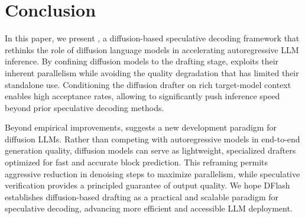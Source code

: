 \section{Conclusion}
\label{sec:conclusion}

In this paper, we present \method, a diffusion-based speculative decoding framework that rethinks the role of diffusion language models in accelerating autoregressive LLM inference. By confining diffusion models to the drafting stage, \method exploits their inherent parallelism while avoiding the quality degradation that has limited their standalone use. Conditioning the diffusion drafter on rich target-model context enables high acceptance rates, allowing \method to significantly push inference speed beyond prior speculative decoding methods.

Beyond empirical improvements, \method suggests a new development paradigm for diffusion LLMs. Rather than competing with autoregressive models in end-to-end generation quality, diffusion models can serve as lightweight, specialized drafters optimized for fast and accurate block prediction. This reframing permits aggressive reduction in denoising steps to maximize parallelism, while speculative verification provides a principled guarantee of output quality. We hope DFlash establishes diffusion-based drafting as a practical and scalable paradigm for speculative decoding, advancing more efficient and accessible LLM deployment.


